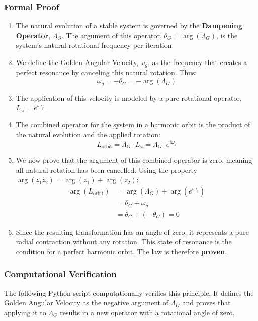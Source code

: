 \subsubsection*{Formal Proof}
\begin{enumerate}
    \item The natural evolution of a stable system is governed by the \textbf{Dampening Operator}, $\Lambda_G$. The argument of this operator, $\theta_G = \arg(\Lambda_G)$, is the system's natural rotational frequency per iteration.
    
    \item We define the Golden Angular Velocity, $\omega_g$, as the frequency that creates a perfect resonance by canceling this natural rotation. Thus:
    $$ \omega_g = -\theta_G = -\arg(\Lambda_G) $$
    
    \item The application of this velocity is modeled by a pure rotational operator, $L_\omega = e^{i\omega_g}$.
    
    \item The combined operator for the system in a harmonic orbit is the product of the natural evolution and the applied rotation:
    $$ L_{\text{orbit}} = \Lambda_G \cdot L_\omega = \Lambda_G \cdot e^{i\omega_g} $$
    
    \item We now prove that the argument of this combined operator is zero, meaning all natural rotation has been cancelled. Using the property $\arg(z_1 z_2) = \arg(z_1) + \arg(z_2)$:
    \begin{align*}
        \arg(L_{\text{orbit}}) &= \arg(\Lambda_G) + \arg(e^{i\omega_g}) \\
        &= \theta_G + \omega_g \\
        &= \theta_G + (-\theta_G) = 0
    \end{align*}

    \item Since the resulting transformation has an angle of zero, it represents a pure radial contraction without any rotation. This state of resonance is the condition for a perfect harmonic orbit. The law is therefore \textbf{proven}.
\end{enumerate}

\subsubsection*{Computational Verification}
The following Python script computationally verifies this principle. It defines the Golden Angular Velocity as the negative argument of $\Lambda_G$ and proves that applying it to $\Lambda_G$ results in a new operator with a rotational angle of zero.


